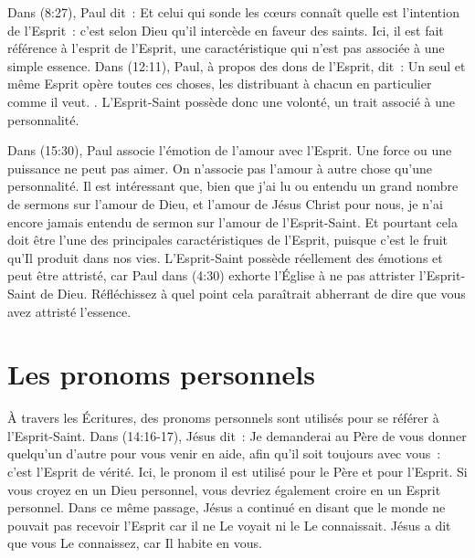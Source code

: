 Dans (8:27), Paul dit~: \og Et celui qui sonde les cœurs connaît quelle est l'intention de l'Esprit~: c'est selon Dieu qu'il intercède en faveur des saints. \fg{} Ici, il est fait référence à l'esprit  de l'Esprit, une caractéristique qui n'est pas associée à une simple essence. Dans (12:11), Paul, à propos des dons de l'Esprit, dit~: \og Un seul et même Esprit opère toutes ces choses, les distribuant à chacun en particulier comme il veut. \fg{}. L'Esprit-Saint possède donc une volonté, un trait associé à une personnalité.

Dans (15:30), Paul associe l'émotion de l'amour avec l'Esprit. Une force ou une puissance ne peut pas aimer. On n'associe pas l'amour à autre chose qu'une personnalité. Il est intéressant que, bien que j'ai lu ou entendu un grand nombre de sermons sur l'amour de Dieu, et l'amour de Jésus Christ pour nous, je n'ai encore jamais entendu de sermon sur l'amour de l'Esprit-Saint. Et pourtant cela doit être l'une des principales caractéristiques de l'Esprit, puisque c'est le fruit qu'Il produit dans nos vies. L'Esprit-Saint possède réellement des émotions et peut être attristé, car Paul dans (4:30) exhorte l'Église à ne pas attrister l'Esprit-Saint de Dieu. Réfléchissez à quel point cela paraîtrait abherrant de dire que vous avez attristé l'essence.


\section*{Les pronoms personnels}

À travers les Écritures, des pronoms personnels sont utilisés pour se référer à l'Esprit-Saint. Dans (14:16-17), Jésus dit~: \og Je demanderai au Père de vous donner quelqu'un d'autre pour vous venir en aide, afin qu'il soit toujours avec vous~: c'est l'Esprit de vérité. \fg{} Ici, le pronom \og il \fg{} est utilisé pour le Père et pour l'Esprit. Si vous croyez en un Dieu personnel, vous devriez également croire en un Esprit personnel. Dans ce même passage, Jésus a continué en disant que le monde ne pouvait pas recevoir l'Esprit car il ne Le voyait ni le Le connaissait. Jésus a dit que vous Le connaissez, car Il habite en vous.

